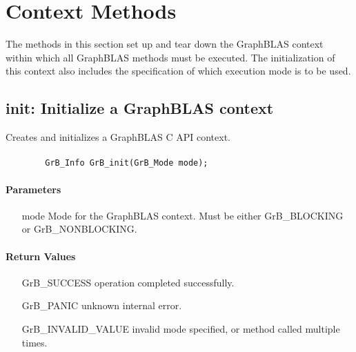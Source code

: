 \section{Context Methods}

The methods in this section set up and tear down the GraphBLAS
context within which all GraphBLAS methods must be executed.  The initialization
of this context also includes the specification of which execution mode is
to be used.

\subsection{{\sf init}: Initialize a GraphBLAS context}

Creates and initializes a GraphBLAS C API context.

\paragraph{\syntax}

\begin{verbatim}
        GrB_Info GrB_init(GrB_Mode mode);
\end{verbatim}


\paragraph{Parameters}

\begin{itemize}[leftmargin=1.1in]
	\item[{\sf mode}] Mode for the GraphBLAS context. Must be either {\sf GrB\_BLOCKING}
    or {\sf GrB\_NONBLOCKING}.
\end{itemize}

\paragraph{Return Values}

\begin{itemize}[leftmargin=2.1in]
\item[{\sf GrB\_SUCCESS}]           operation completed successfully.
\item[{\sf GrB\_PANIC}]             unknown internal error.
\item[{\sf GrB\_INVALID\_VALUE}]    invalid mode specified, or method called multiple times.
\end{itemize}


